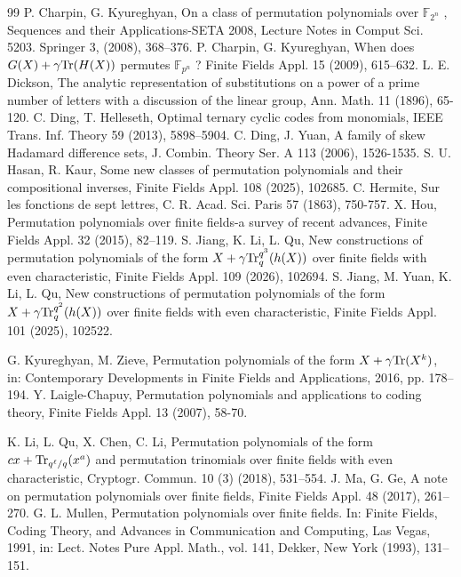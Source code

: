 \documentclass[11pt]{amsart}
\theoremstyle{plain}
\numberwithin{equation}{section}
\theoremstyle{definition}
\newcommand{\F}{\mathbb F}
\def\Tr{{\rm Tr}}
\begin{document}
\begin{thebibliography}{99}
 P. Charpin, G. Kyureghyan, On a class of permutation polynomials over $\F_{2^n}$ , Sequences and their Applications-SETA 2008, Lecture Notes in Comput Sci. 5203. Springer 3, (2008), 368–376.
 P. Charpin, G. Kyureghyan, When does $G(X) + \gamma\Tr(H(X))$ permutes $\F_{p^n}$ ? Finite Fields Appl. 15 (2009), 615–632.
  L. E. Dickson, The analytic representation of substitutions on a power of a prime number of letters with a discussion of the linear group,  Ann. Math. 11 (1896), 65-120.
  C. Ding, T. Helleseth, Optimal ternary cyclic codes from monomials, IEEE Trans. Inf. Theory 59 (2013), 5898--5904.
  C. Ding, J. Yuan, A family of skew Hadamard difference sets, J. Combin. Theory Ser. A 113 (2006), 1526-1535.
  S. U. Hasan, R. Kaur, Some new classes of permutation polynomials and their compositional inverses, Finite Fields Appl. 108 (2025), 102685.
 C. Hermite, Sur les fonctions de sept lettres, C. R. Acad. Sci. Paris 57 (1863), 750-757.
 X. Hou, Permutation polynomials over finite fields-a survey of recent advances, Finite Fields Appl. 32 (2015), 82--119.
  S. Jiang, K. Li, L. Qu,  New constructions of permutation polynomials of the form $X+ \gamma \Tr_q^{q^3} (h (X))$ over finite fields with even characteristic, Finite Fields Appl. 109 (2026), 102694.
 S. Jiang, M. Yuan, K. Li, L. Qu,  New constructions of permutation polynomials of the form $X+ \gamma \Tr_q^{q^2} (h (X))$ over finite fields with even characteristic, Finite Fields Appl. 101 (2025), 102522.

G. Kyureghyan, M. Zieve, Permutation polynomials of the form $X + \gamma \Tr(X^k)$, in: Contemporary Developments in Finite Fields and Applications, 2016, pp. 178–194.
 Y. Laigle-Chapuy,  Permutation polynomials and applications to coding theory, Finite Fields Appl. 13 (2007), 58-70.

 K. Li, L. Qu, X. Chen, C. Li, Permutation polynomials of the form $cx+\Tr_{q^{\ell}/q}(x^a)$ and permutation trinomials over finite fields with even characteristic, Cryptogr. Commun. 10 (3) (2018), 531--554.
J. Ma, G. Ge, A note on permutation polynomials over finite fields, Finite Fields Appl. 48 (2017), 261–270.
  G. L. Mullen, Permutation polynomials over finite fields. In: Finite Fields, Coding Theory, and Advances in Communication and Computing, Las Vegas, 1991, in: Lect. Notes Pure Appl. Math., vol. 141, Dekker, New York (1993), 131--151.


\end{thebibliography}
\end{document}
